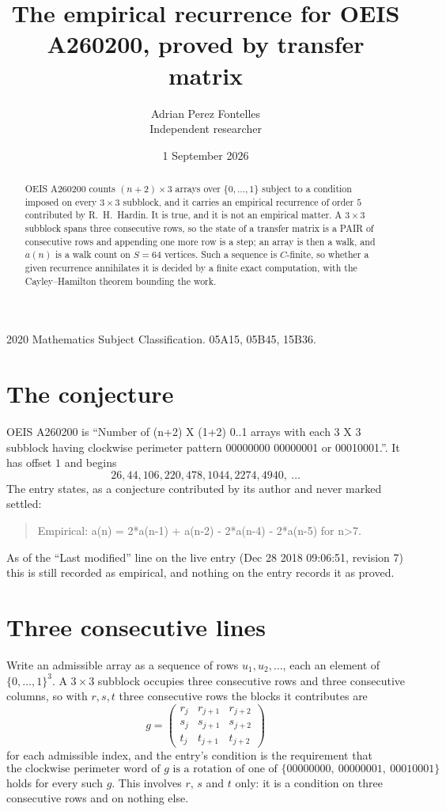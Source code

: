 \documentclass[11pt,a4paper]{article}
\title{The empirical recurrence for OEIS A260200, proved by transfer matrix}
\author{Adrian Perez Fontelles\\ \small Independent researcher}
\date{1 September 2026}
\theoremstyle{plain}
\theoremstyle{definition}
\begin{document}
\maketitle

\begin{abstract}
OEIS A260200 counts $(n+2)\times3$ arrays over $\{0,\dots,1\}$ subject to a condition imposed on
every $3\times3$ subblock, and it carries an empirical recurrence of order $5$
contributed by R.~H.~Hardin. It is true, and it is not an empirical matter. A $3\times3$
subblock spans three consecutive rows, so the state of a transfer matrix is a PAIR of
consecutive rows and appending one more row is a step; an array is then a walk, and
$a(n)$ is a walk count on $S=64$ vertices. Such a sequence is $C$-finite, so whether a given
recurrence annihilates it is decided by a finite exact computation, with the Cayley--Hamilton
theorem bounding the work.
\end{abstract}

\noindent\small 2020 Mathematics Subject Classification. 05A15, 05B45, 15B36.\normalsize

\section{The conjecture}

OEIS A260200 is ``Number of (n+2) X (1+2) 0..1 arrays with each 3 X 3 subblock having clockwise perimeter pattern 00000000 00000001 or 00010001.''. It has offset $1$ and begins
\[
26, 44, 106, 220, 478, 1044, 2274, 4940,\ \dots
\]
The entry states, as a conjecture contributed by its author and never marked settled:
\begin{quote}
Empirical: a(n) = 2*a(n-1) + a(n-2) - 2*a(n-4) - 2*a(n-5) for n>7.
\end{quote}
As of the ``Last modified'' line on the live entry (Dec 28 2018 09:06:51, revision 7) this is still
recorded as empirical, and nothing on the entry records it as proved.

\section{Three consecutive lines}

Write an admissible array as a sequence of rows $u_1,u_2,\dots$, each an element of
$\{0,\dots,1\}^{3}$. A $3\times3$ subblock occupies three consecutive rows and
three consecutive columns, so with $r,s,t$ three consecutive rows the blocks it
contributes are
\[
g=\begin{pmatrix}r_j&r_{j+1}&r_{j+2}\\ s_j&s_{j+1}&s_{j+2}\\ t_j&t_{j+1}&t_{j+2}\end{pmatrix}
\]
for each admissible index, and the entry's condition is the requirement that
\[
\text{the clockwise perimeter word of }g\text{ is a rotation of one of }\{00000000,\ 00000001,\ 00010001\}
\]
holds for every such $g$. This involves $r$, $s$ and $t$ only: it is a condition on
three consecutive rows and on nothing else.
\end{document}
